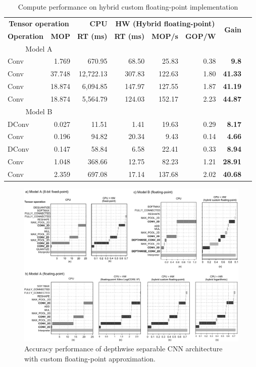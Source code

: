 \begin{table}[!htp]\centering
	\caption{Compute performance on hybrid custom floating-point implementation}\label{tab:performace_float_hybrid }
	\scriptsize
	\begin{tabular}{lrrrrrrr}\toprule
		\multicolumn{2}{c}{\textbf{Tensor operation}} &\textbf{CPU} &\multicolumn{3}{c}{\textbf{HW (Hybrid floating-point)}} &\multirow{2}{*}{\textbf{Gain}} \\\cmidrule{1-6}
		\textbf{Operation} &\textbf{MOP} &\textbf{RT (ms)} &\textbf{RT (ms)} &\textbf{MOP/s} &\textbf{GOP/W} & \\\midrule
		\multicolumn{2}{c}{Model A} & & & & & \\
		Conv &1.769 &670.95 &68.50 &25.83 &0.38 &\textbf{9.8} \\
		Conv &37.748 &12,722.13 &307.83 &122.63 &1.80 &\textbf{41.33} \\
		Conv &18.874 &6,094.85 &147.97 &127.55 &1.87 &\textbf{41.19} \\
		Conv &18.874 &5,564.79 &124.03 &152.17 &2.23 &\textbf{44.87} \\
		\multicolumn{2}{c}{Model B} & & & & & \\
		DConv &0.027 &11.51 &1.41 &19.63 &0.29 &\textbf{8.17} \\
		Conv &0.196 &94.82 &20.34 &9.43 &0.14 &\textbf{4.66} \\
		DConv &0.147 &58.84 &6.58 &22.41 &0.33 &\textbf{8.94} \\
		Conv &1.048 &368.66 &12.75 &82.23 &1.21 &\textbf{28.91} \\
		Conv &2.359 &697.08 &17.14 &137.68 &2.02 &\textbf{40.68} \\
		\bottomrule
	\end{tabular}
\end{table}

\begin{figure}[t!]
	\centering
	\includegraphics[width=\textwidth]{../figures/inference_schedule_wide.pdf}
	\caption{Accuracy performance of depthwise separable CNN architecture with custom floating-point approximation.}
	\label{fig:fixed_point}
\end{figure}
